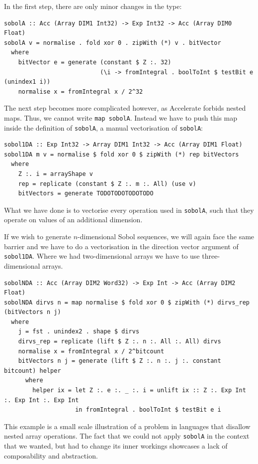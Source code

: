\documentclass{llncs2e/llncs}
\begin{document}
In the first step, there are only minor changes in the type:
\begin{verbatim}
sobolA :: Acc (Array DIM1 Int32) -> Exp Int32 -> Acc (Array DIM0 Float)
sobolA v = normalise . fold xor 0 . zipWith (*) v . bitVector
  where
    bitVector e = generate (constant $ Z :. 32)
                           (\i -> fromIntegral . boolToInt $ testBit e (unindex1 i))
    normalise x = fromIntegral x / 2^32
\end{verbatim}

The next step becomes more complicated however, as Accelerate forbids
nested maps. Thus, we cannot write \verb|map sobolA|.
Instead we have to push this map inside the definition of
\verb|sobolA|, a manual vectorisation of \verb|sobolA|:
\begin{verbatim}
sobol1DA :: Exp Int32 -> Array DIM1 Int32 -> Acc (Array DIM1 Float)
sobol1DA m v = normalise $ fold xor 0 $ zipWith (*) rep bitVectors
  where
    Z :. i = arrayShape v
    rep = replicate (constant $ Z :. m :. All) (use v)
    bitVectors = generate TODOTODOTODOTODO
\end{verbatim}
What we have done is to vectorise every operation used in
\verb|sobolA|, such that they operate on values of an additional
dimension.

If we wish to generate $n$-dimensional Sobol sequences, we will again
face the same barrier and we have to do a vectorisation in the
direction vector argument of \verb|sobol1DA|. Where we had
two-dimensional arrays we have to use three-dimensional arrays. %

\begin{verbatim}
sobolNDA :: Acc (Array DIM2 Word32) -> Exp Int -> Acc (Array DIM2 Float)
sobolNDA dirvs n = map normalise $ fold xor 0 $ zipWith (*) dirvs_rep (bitVectors n j)
  where
    j = fst . unindex2 . shape $ dirvs
    dirvs_rep = replicate (lift $ Z :. n :. All :. All) dirvs
    normalise x = fromIntegral x / 2^bitcount
    bitVectors n j = generate (lift $ Z :. n :. j :. constant bitcount) helper
      where
        helper ix = let Z :. e :. _ :. i = unlift ix :: Z :. Exp Int :. Exp Int :. Exp Int
                    in fromIntegral . boolToInt $ testBit e i
\end{verbatim}

This example is a small scale illustration of a problem in languages
that disallow nested array operations. The fact that we could not
apply \verb|sobolA| in the context that we wanted, but had to change
its inner workings showcases a lack of composability and abstraction. %
\end{document}
